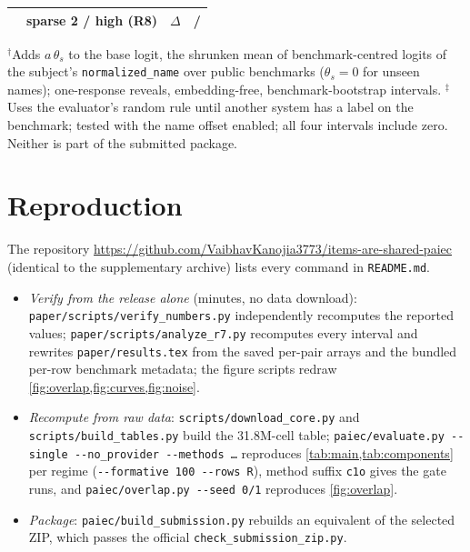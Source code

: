 \documentclass{article}
\begin{document}
\begin{table}[H]
\begin{tabular}{@{}llll@{}}
    & sparse 2 / high (R8) & $\Delta$ & \dSpTwoGate{} / \dHighGate{} \\
    \bottomrule
  \end{tabular}
{\raggedright\footnotesize $^{\dagger}$Adds $a\,\theta_s$ to the base logit, the shrunken mean of benchmark-centred logits of the subject's \texttt{normalized\_name} over public benchmarks ($\theta_s=0$ for unseen names); one-response reveals, embedding-free, benchmark-bootstrap intervals. $^{\ddagger}$Uses the evaluator's random rule until another system has a label on the benchmark; tested with the name offset enabled; all four intervals include zero. Neither is part of the submitted package.\par}
\end{table}

\section{Reproduction}\label{app:repro}
The repository \url{https://github.com/VaibhavKanojia3773/items-are-shared-paiec} (identical to the supplementary archive) lists every command in \texttt{README.md}.
{\raggedright
\begin{itemize}
  \item \emph{Verify from the release alone} (minutes, no data download): \texttt{paper/scripts/verify\_numbers.py} independently recomputes the reported values; \texttt{paper/scripts/analyze\_r7.py} recomputes every interval and rewrites \texttt{paper/results.tex} from the saved per-pair arrays and the bundled per-row benchmark metadata; the figure scripts redraw \cref{fig:overlap,fig:curves,fig:noise}.
  \item \emph{Recompute from raw data}: \texttt{scripts/download\_core.py} and \texttt{scripts/build\_tables.py} build the 31.8M-cell table; \texttt{paiec/evaluate.py -{}-single -{}-no\_provider -{}-methods \ldots} reproduces \cref{tab:main,tab:components} per regime (\texttt{-{}-formative 100 -{}-rows R}), method suffix \texttt{c1o} gives the gate runs, and \texttt{paiec/overlap.py -{}-seed 0/1} reproduces \cref{fig:overlap}.
  \item \emph{Package}: \texttt{paiec/build\_submission.py} rebuilds an equivalent of the selected ZIP, which passes the official \texttt{check\_submission\_zip.py}.
\end{itemize}
}
\end{document}
